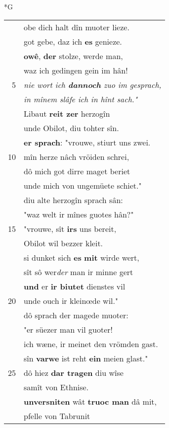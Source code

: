 \documentclass[8pt,a4paper,notitlepage]{article}
\begin{document}
\begin{table}[ht]
\begin{minipage}[t]{0.5\linewidth}
\small
\begin{center}*G
\end{center}
\begin{tabular}{rl}
 & obe dich halt dîn muoter lieze.\\ 
 & got gebe, daz ich \textbf{es} genieze.\\ 
 & \textbf{owê}, \textbf{der} stolze, werde man,\\ 
 & waz ich gedingen gein im hân!\\ 
5 & \textit{nie wort ich \textbf{dannoch} zuo im gesprach,}\\ 
 & \textit{in mînem slâfe ich in hînt sach."}\\ 
 & Libaut \textbf{reit zer} herzogîn\\ 
 & unde Obilot, diu tohter sîn.\\ 
 & \textbf{er sprach}: "vrouwe, stiurt uns zwei.\\ 
10 & mîn herze nâch vröiden schrei,\\ 
 & dô mich got dirre maget beriet\\ 
 & unde mich von ungemüete schiet."\\ 
 & diu alte herzogîn sprach sân:\\ 
 & "waz welt ir mînes guotes hân?"\\ 
15 & "vrouwe, sît \textbf{irs} uns bereit,\\ 
 & Obilot wil bezzer kleit.\\ 
 & si dunket sich \textbf{es} \textbf{mit} wirde wert,\\ 
 & sît sô wer\textit{der} man ir minne gert\\ 
 & \textbf{und} er \textbf{ir biutet} dienstes vil\\ 
20 & unde ouch ir kleinœde wil."\\ 
 & dô sprach der magede muoter:\\ 
 & "er süezer man vil guoter!\\ 
 & ich wæne, ir meinet den vrömden gast.\\ 
 & sîn \textbf{varwe} ist reht \textbf{ein} meien glast."\\ 
25 & dô hiez \textbf{dar tragen} diu wîse\\ 
 & samît von Ethnise.\\ 
 & \textbf{unversniten} wât \textbf{truoc man} dâ mit,\\ 
 & pfelle von Tabrunit\\ 

\end{tabular}
\end{minipage}
\end{table}
\end{document}
